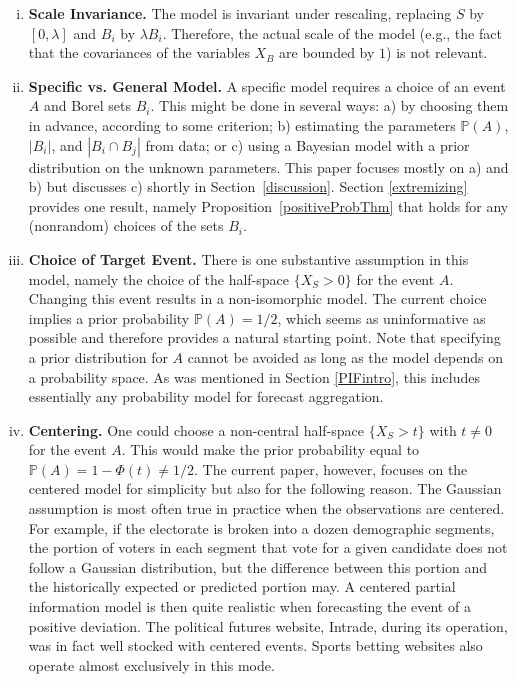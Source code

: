 \documentclass[12pt]{article}
\renewcommand{\P}{\mathbb{P}}
\theoremstyle{definition}
\theoremstyle{definition}
\def\P{{\mathbb P}}
\begin{document}
\begin{enumerate}[(i)]
\item {\bf Scale Invariance.} The model is invariant under rescaling,
replacing $S$ by $[0,\lambda]$ and $B_i$ by $\lambda B_i$.  Therefore,
the actual scale of the model (e.g., the fact that the covariances of
the variables $X_B$ are bounded by $1$) is not relevant.


\item {\bf Specific vs. General Model.} A specific model requires a
choice of an event $A$ and Borel sets $B_i$.
This might be done in several ways: a) by choosing them in advance,
according to some criterion; b) estimating the parameters $\P(A)$,
$|B_i|$, and $|B_i \cap B_j|$ from data; or c) using a Bayesian model
with a prior distribution on the unknown parameters.  This paper
focuses mostly on a) and b) but discusses c) shortly in
Section~\ref{discussion}.  Section \ref{extremizing} provides one
result, namely Proposition~\ref{positiveProbThm} that holds for any (nonrandom) choices of the sets $B_i$.
\label{item:specific}






\item {\bf Choice of Target Event.}  There is one substantive
assumption in this model, namely the choice of the half-space $\{ X_S
> 0 \}$ for the event $A$.  Changing this event results
in a non-isomorphic model. The current choice
implies a prior probability $\P(A) = 1/2$, which seems as
uninformative as possible and therefore provides a natural starting
point. Note that specifying a prior distribution for $A$ cannot be avoided as
long as the model depends on a probability space. As was mentioned in
Section \ref{PIFintro}, this includes essentially any probability
model for forecast aggregation.
\label{item:choice}

\item {\bf Centering.} One could choose a non-central half-space $\{
X_S > t \}$ with $t \neq 0$ for the event $A$.  This would make the prior
probability equal to $\P(A) = 1-\Phi(t) \neq 1/2$. The current paper, however, focuses on the
centered model for simplicity but also for the following reason.  The
Gaussian assumption is most often true in practice when the
observations are centered.  For example, if the electorate
is broken into a dozen demographic segments, the portion of voters in
each segment that vote for a given candidate does not follow a
Gaussian distribution, but the difference between this portion and the
historically expected or predicted portion may.  A centered partial
information model is then quite realistic when forecasting the event
of a positive deviation.  The political futures website, Intrade,
during its operation, was in fact well stocked with centered events. 
Sports betting websites also operate
almost exclusively in this mode.
\label{item:centered}
\end{enumerate}
\end{document}
